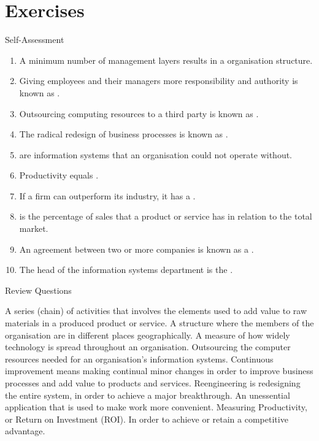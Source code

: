 \documentclass[\main/notes.tex]{subfiles}
\begin{document}
		\section{Exercises}
			\begin{exercise}{Self-Assessment}
				\begin{enumerate}
					\item A minimum number of management layers results in a  organisation structure.
					\item Giving employees and their managers more responsibility and authority is known as .
					\item Outsourcing computing resources to a third party is known as .
					\item The radical redesign of business processes is known as .
					\item {} are information systems that an organisation could not operate without.
					\item Productivity equals .
					\item If a firm can outperform its industry, it has a .
					\item {} is the percentage of sales that a product or service has in relation to the total market.
					\item An agreement between two or more companies is known as a .
					\item The head of the information systems department is the .
				\end{enumerate}
			\end{exercise}
			\begin{exercise}{Review Questions}
				\begin{enumerate}
					A series (chain) of activities that involves the elements used to add value to raw materials in a produced product or service.
					A structure where the members of the organisation are in different places geographically.
					A measure of how widely technology is spread throughout an organisation.
					Outsourcing the computer resources needed for an organisation's information systems.
					Continuous improvement means making continual minor changes in order to improve business processes and add value to products and services. Reengineering is redesigning the entire system, in order to achieve a major breakthrough.
					An unessential application that is used to make work more convenient.
					Measuring Productivity, or Return on Investment (ROI).
					In order to achieve or retain a competitive advantage.
				\end{enumerate}
			\end{exercise}
	\vbox{}
\end{document}

